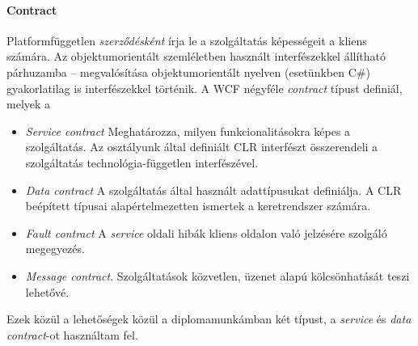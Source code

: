 \paragraph{Contract} Platformfüggetlen \emph{szerződésként} írja le a szolgáltatás képességeit a kliens számára. Az objektumorientált szemléletben használt interfészekkel állítható párhuzamba -- megvalósítása objektumorientált nyelven (esetünkben C\#) gyakorlatilag is interfészekkel történik. A WCF négyféle \emph{contract} típust definiál, melyek a 
\begin{itemize}
\setlength\itemsep{.1em}
\item \emph{Service contract} Meghatározza, milyen funkcionalitásokra képes a szolgáltatás. Az osztályunk által definiált CLR interfészt összerendeli a szolgáltatás technológia-független interfészével. 
\item \emph{Data contract} A szolgáltatás által használt adattípusukat definiálja. A CLR beépített típusai alapértelmezetten ismertek a keretrendszer számára.
\item \emph{Fault contract} A \emph{service} oldali hibák kliens oldalon való jelzésére szolgáló megegyezés.
\item \emph{Message contract}. Szolgáltatások közvetlen, üzenet alapú kölcsönhatását teszi lehetővé. 
\end{itemize}
Ezek közül a lehetőségek közül a diplomamunkámban két típust, a \emph{service} és \emph{data contract}-ot használtam fel.

